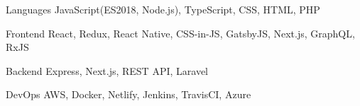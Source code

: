 

\begin{cvskills}

  \cvskill
    {Languages} %
    {JavaScript(ES2018, Node.js), TypeScript, CSS, HTML, PHP} %

  \cvskill
    {Frontend} %
    {React, Redux, React Native, CSS-in-JS, GatsbyJS, Next.js, GraphQL, RxJS} %

  \cvskill
    {Backend} %
    {Express, Next.js, REST API, Laravel} %

  \cvskill
  {DevOps} %
  {AWS, Docker, Netlify, Jenkins, TravisCI, Azure} %

\end{cvskills}

